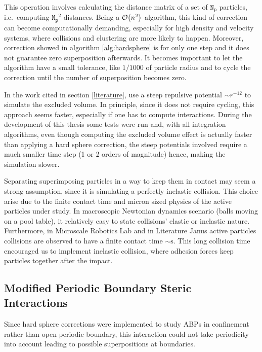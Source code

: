 \documentclass[../../master_thesis_np.tex]{subfiles}
\begin{document}
	This operation involves calculating the distance matrix of a set of $\mathtt{N_p}$ particles, i.e.\ computing $\mathtt{N_p}^2$ distances. Being a $\order{n^2}$ algorithm, this kind of correction can become computationally demanding, especially for high density and velocity systems, where collisions and clustering are more likely to happen. Moreover, correction showed in algorithm \ref{alg:hardsphere} is for only one step and it does not guarantee zero superposition afterwards. It becomes important to let the algorithm have a small tolerance, like $1/1000$ of particle radius and to cycle the correction until the number of superposition becomes zero.
	
	In the work cited in section \ref{literature}, \citeauthor{martin-gomez_collective_2018} use a steep repulsive potential $\sim r^{-12}$ to simulate the excluded volume. In principle, since it does not require cycling, this approach seems faster, especially if one has to compute interactions. During the development of this thesis some tests were run and, with all integration algorithms, even though computing the excluded volume effect is actually faster than applying a hard sphere correction, the steep potentials involved require a much smaller time step (1 or 2 orders of magnitude) hence, making the simulation slower.
	
	Separating superimposing particles in a way to keep them in contact may seem a strong assumption, since it is simulating a perfectly inelastic collision. This choice arise due to the finite contact time and micron sized physics of the active particles under study. In macroscopic Newtonian dynamics scenario (balls moving on a pool table), it relatively easy to state collisions' elastic or inelastic nature. Furthermore, in Microscale Robotics Lab and in Literature \cite{singh_pair_2024} Janus active particles collisions are observed to have a finite contact time $\sim \text{s}$. This long collision time encouraged us to implement inelastic collision, where adhesion forces keep particles together after the impact.
	
	\subsection{Modified Periodic Boundary Steric Interactions}
	Since hard sphere corrections were implemented to study ABPs in confinement rather than open periodic boundary, this interaction could not take periodicity into account leading to possible superpositions at boundaries.
	
\end{document}
